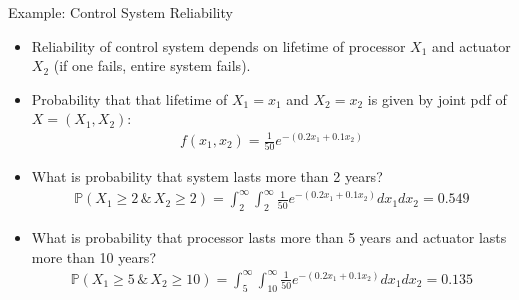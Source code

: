 \documentclass[9pt]{beamer}
\begin{document}
%
\begin{frame}{Example: Control System Reliability}

\begin{itemize}
\item Reliability of control system depends on lifetime of processor $X_1$ and actuator $X_2$ (if one fails, entire system fails).
\item Probability that that lifetime of $X_1=x_1$ and $X_2=x_2$ is given by joint pdf of $X=(X_1,X_2)$:
\begin{align*}
f(x_1,x_2)=\frac{1}{50}e^{-(0.2x_1+0.1x_2)}
\end{align*} 
\item What is probability that system lasts more than 2 years?
\begin{align*}
\mathbb{P}(X_1\geq 2\,\&\,X_2\geq 2)=\int_{2}^{\infty}\int_{2}^{\infty}\frac{1}{50}e^{-(0.2x_1+0.1x_2)}dx_1dx_2=0.549
\end{align*}
\item What is probability that processor lasts more than 5 years and actuator lasts more than 10 years?
\begin{align*}
\mathbb{P}(X_1\geq 5\,\&\,X_2\geq 10)=\int_{5}^{\infty}\int_{10}^{\infty}\frac{1}{50}e^{-(0.2x_1+0.1x_2)}dx_1dx_2=0.135
\end{align*}
\end{itemize}

\end{frame}
\end{document}
